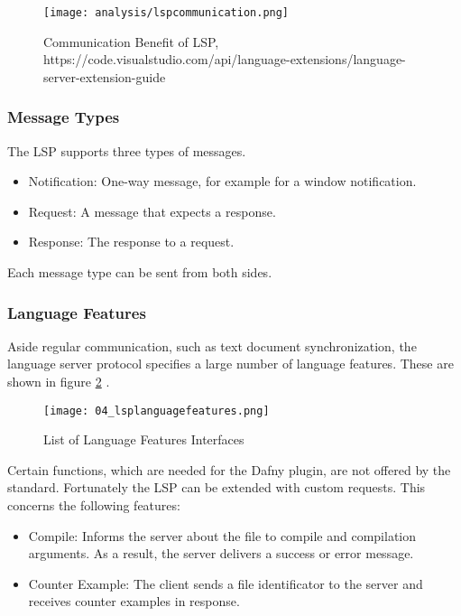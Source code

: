 \begin{figure}[h]
    \centering
    \texttt{[image: analysis/lspcommunication.png]}
    \caption{Communication Benefit of LSP, https://code.visualstudio.com/api/language-extensions/language-server-extension-guide} 
    \label{fig:lspcommunication}
\end{figure}

\subsubsection{Message Types}
The LSP supports three types of messages.
\begin{itemize}
    \item Notification: One-way message, for example for a window notification.
    \item Request: A message that expects a response.
    \item Response: The response to a request.
\end{itemize}
Each message type can be sent from both sides.

\subsubsection{Language Features}
Aside regular communication, such as text document synchronization,
the language server protocol specifies a large number of language features.
These are shown in figure \ref{fig:lsplanguagefeatures} \cite{lspspec}.

\begin{figure}[H]
    \centering
    \texttt{[image: 04\_lsplanguagefeatures.png]}
    \caption{List of Language Features Interfaces}
    \label{fig:lsplanguagefeatures}
\end{figure}

Certain functions, which are needed for the Dafny plugin, are not offered by the standard.
Fortunately the LSP can be extended with custom requests. This concerns the following features:
\begin{itemize}
    \item Compile: Informs the server about the file to compile and compilation arguments.
          As a result, the server delivers a success or error message.
    \item Counter Example: The client sends a file identificator to the server and receives
           counter examples in response.
\end{itemize}

